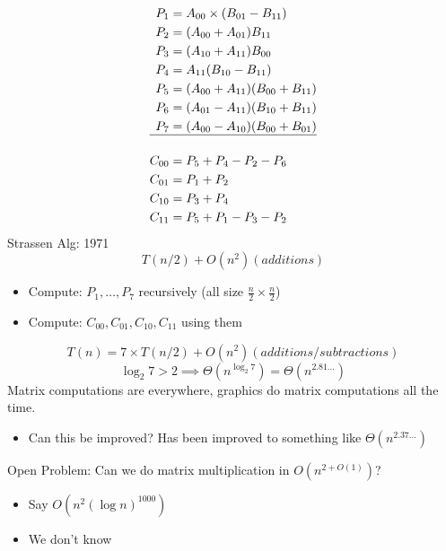 \documentclass[11pt]{article}
\begin{document}
\begin{align*}
P_1 & = A_{00}\times (B_{01}-B_{11})
\\ P_2 & = (A_{00}+A_{01})B_{11}
\\ P_3 & = (A_{10}+A_{11})B_{00}
\\ P_4 & = A_{11}(B_{10}-B_{11})
\\P_5 & = (A_{00}+A_{11})(B_{00}+B_{11})
\\P_6 & = (A_{01}-A_{11})(B_{10}+B_{11})
\\ P_7 & = (A_{00}-A_{10})(B_{00}+B_{01})
\\ \hline
\\ C_{00} & = P_5+P_4-P_2-P_6
\\ C_{01} & = P_1+P_2
\\ C_{10} & = P_3+P_4
\\ C_{11} & = P_5+P_1-P_3-P_2
\end{align*}
Strassen Alg: 1971
$$ T(n/2)+O(n^2) (additions)$$
\begin{itemize}
\item Compute: \(P_1,\ldots,P_7\) recursively (all size \(\frac{n}{2}\times \frac{n}{2}\))
\item Compute: \(C_{00}, C_{01},C_{10},C_{11}\) using them
\end{itemize}
$$T(n)=7 \times T(n/2)+O(n^2)(additions/subtractions)$$
$$\log_2 7 > 2 \implies \Theta (n^{\log_2 7})=\Theta(n^{2.81\ldots})$$
Matrix computations are everywhere, graphics do matrix computations all the time. 
\begin{itemize}
\item Can this be improved? Has been improved to something like \(\Theta(n^{2.37\ldots})\)
\end{itemize}
Open Problem: Can we do matrix multiplication in \(O(n^{2+O(1)})\)?
\begin{itemize}
\item Say \(O(n^2(\log n)^{1000})\)
\item We don't know
\end{itemize}
\end{document}
